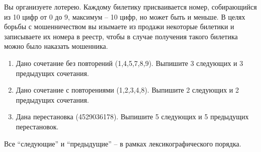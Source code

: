 \question
Вы организуете лотерею. Каждому билетику присваивается номер, собирающийся из 10 цифр от 0 до 9, максимум – 10 цифр, но может быть и меньше. В целях борьбы с мошенничеством вы изымаете из продажи некоторые билетики и записываете их номера в реестр, чтобы в случае получения такого билетика можно было наказать мошенника.

\begin{enumerate}
	\item Дано сочетание без повторений (1,4,5,7,8,9). Выпишите 3 следующих и 3 предыдущих сочетания.
	\item Дано сочетание с повторениями (1,2,3,4,8). Выпишите 2 следующих и 2 предыдущих сочетания.
	\item Дана перестановка (4529036178). Выпишите 5 следующих и 5 предыдущих перестановок.
\end{enumerate}

Все “следующие” и “предыдущие” – в рамках лексикографического порядка.
